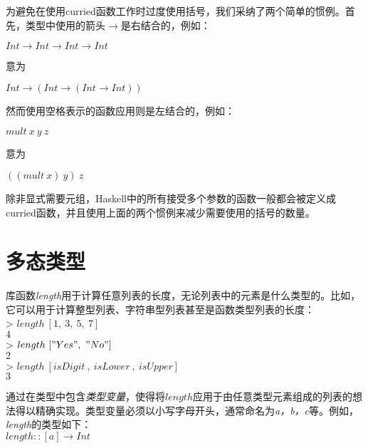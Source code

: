 为避免在使用curried函数工作时过度使用括号，我们采纳了两个简单的惯例。首先，类型中使用的箭头$\rightarrow$是右结合的，例如：

\noindent\hspace*{1cm} $Int \rightarrow Int \rightarrow Int \rightarrow Int$

意为

\noindent\hspace*{1cm} $Int \rightarrow (Int \rightarrow (Int \rightarrow Int))$

然而使用空格表示的函数应用则是左结合的，例如：

\noindent\hspace*{1cm} $mult~x~y~z$

意为

\noindent\hspace*{1cm} $((mult~x)~y)~z$

除非显式需要元组，Haskell中的所有接受多个参数的函数一般都会被定义成curried函数，并且使用上面的两个惯例来减少需要使用的括号的数量。

\section{多态类型}

库函数\textit{length}用于计算任意列表的长度，无论列表中的元素是什么类型的。比如，它可以用于计算整型列表、字符串型列表甚至是函数类型列表的长度：\\
\hspace*{1cm} > $length~[1,~3,~5,~7]$\\
\hspace*{1cm} $4$\\
\hspace*{1cm} > $length~["Yes",~"No"]$\\
\hspace*{1cm} $2$\\
\hspace*{1cm} > $length~[isDigit~,~isLower~,~isUpper]$\\
\hspace*{1cm} $3$

通过在类型中包含\textit{类型变量}，使得将$length$应用于由任意类型元素组成的列表的想法得以精确实现。类型变量必须以小写字母开头，通常命名为\textit{a，b，c}等。例如，\textit{length}的类型如下：\\
\hspace*{1cm} $length :: [a] \rightarrow Int$

